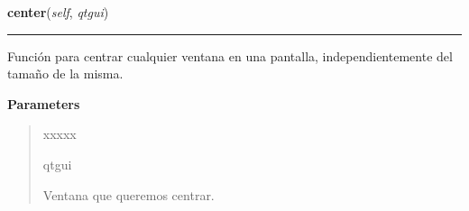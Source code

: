     \vspace{0.5ex}

\hspace{.8\funcindent}\begin{boxedminipage}{\funcwidth}

    \raggedright \textbf{center}(\textit{self}, \textit{qtgui})

    \vspace{-1.5ex}

    \rule{\textwidth}{0.5\fboxrule}
\setlength{\parskip}{2ex}
    Función para centrar cualquier ventana en una pantalla, 
    independientemente del tamaño de la misma.

\setlength{\parskip}{1ex}
      \textbf{Parameters}
      \vspace{-1ex}

      \begin{quote}
        \begin{Ventry}{xxxxx}

          \item[qtgui]

          Ventana que queremos centrar.

        \end{Ventry}

      \end{quote}

    \end{boxedminipage}

    \label{creaVentanas:CreaVentanas:crearVentanaInformacion}

    \vspace{0.5ex}

